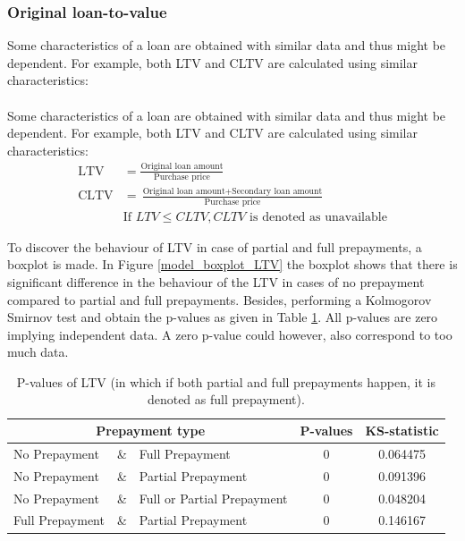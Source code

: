     \subsubsection{Original loan-to-value}
        Some characteristics of a loan are obtained with similar data and thus might be dependent. For example, both LTV and CLTV are calculated using similar characteristics: 
        \\\\
        Some characteristics of a loan are obtained with similar data and thus might be dependent. For example, both LTV and CLTV are calculated using similar characteristics: 
        \begin{align}
            \text{LTV}&=\frac{\text{Original loan amount}}{\text{Purchase price}}\\
            \text{CLTV}&=\frac{\text{Original loan amount}+\text{Secondary loan amount}}{\text{Purchase price}}\\
            &\text{If } LTV \leq CLTV, CLTV \text{ is denoted as unavailable}
        \end{align}
    
    
        To discover the behaviour of LTV in case of partial and full prepayments, a boxplot is made. In Figure \ref{model_boxplot_LTV} the boxplot shows that there is significant difference in the behaviour of the LTV in cases of no prepayment compared to partial and full prepayments. Besides, performing a Kolmogorov Smirnov test and obtain the p-values as given in Table \ref{model_Pvals_of_LTV}. All p-values are zero implying independent data. A zero p-value could however, also correspond to too much data. 
        \begin{table}[H]
        \centering
            \begin{tabular}{lcl|c|c}
            \multicolumn{3}{c|}{Prepayment type} & P-values& KS-statistic \\\hline
            No Prepayment & \& & Full Prepayment & 0 & 0.064475\\
            No Prepayment & \& & Partial Prepayment & 0 & 0.091396\\
            No Prepayment & \& & Full or Partial Prepayment & 0 & 0.048204 \\
            Full Prepayment & \& & Partial Prepayment & 0 & 0.146167
		    \end{tabular}
            \caption{P-values of LTV (in which if both partial and full prepayments happen, it is denoted as full prepayment).}
	        \label{model_Pvals_of_LTV}
        \end{table}
    
